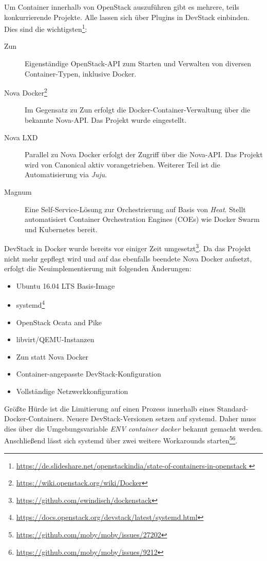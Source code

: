 Um Container innerhalb von OpenStack auszuführen gibt es mehrere, teils konkurrierende Projekte. Alle lassen sich über Plugins in DevStack einbinden. Dies sind die wichtigsten\footnote{\url{https://de.slideshare.net/openstackindia/state-of-containers-in-openstack
}}:

\begin{description}
	\item[Zun] Eigenständige OpenStack-API zum Starten und Verwalten von diversen Container-Typen, inklusive Docker.
	\item[Nova Docker\footnote{\url{https://wiki.openstack.org/wiki/Docker}}] Im Gegensatz zu Zun erfolgt die Docker-Container-Verwaltung über die bekannte Nova-API. Das Projekt wurde eingestellt.
	\item[Nova LXD] Parallel zu Nova Docker erfolgt der Zugriff über die Nova-API. Das Projekt wird von Canonical aktiv vorangetrieben. Weiterer Teil ist die Automatisierung via \emph{Juju}.
	\item[Magnum] Eine Self-Service-Lösung zur Orchestrierung auf Basis von \emph{Heat}. Stellt automatisiert Container Orchestration Engines (COEs) wie Docker Swarm und Kubernetes bereit.
\end{description}

\noindent DevStack in Docker wurde bereits vor einiger Zeit umgesetzt\footnote{\url{https://github.com/ewindisch/dockenstack}}. Da das Projekt nicht mehr gepflegt wird und auf das ebenfalls beendete Nova Docker aufsetzt, erfolgt die Neuimplementierung mit folgenden Änderungen:

\begin{itemize}
	
	\item Ubuntu 16.04 LTS Basis-Image
	\item systemd\footnote{\url{https://docs.openstack.org/devstack/latest/systemd.html}}
	\item OpenStack Ocata and Pike
	\item libvirt/QEMU-Instanzen
	\item Zun statt Nova Docker
	\item Container-angepasste DevStack-Konfiguration
	\item Vollständige Netzwerkkonfiguration
	
\end{itemize}


\noindent Größte Hürde ist die Limitierung auf einen Prozess innerhalb eines Standard-Docker-Containers. Neuere DevStack-Versionen setzen auf systemd. Daher muss dies über die Umgebungsvariable \emph{ENV container docker} bekannt gemacht werden. Anschließend lässt sich systemd über zwei weitere Workarounds starten\footnote{\url{https://github.com/moby/moby/issues/27202}}\footnote{\url{https://github.com/moby/moby/issues/9212}}.

